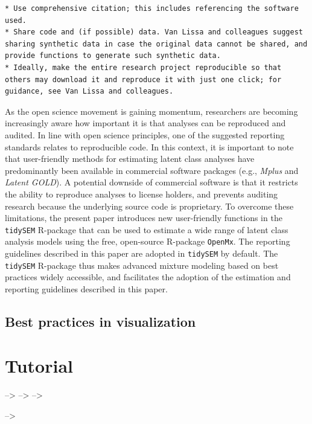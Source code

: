 \documentclass[
  ,man]{apa6}
\begin{document}
\begin{verbatim}
* Use comprehensive citation; this includes referencing the software used.
* Share code and (if possible) data. Van Lissa and colleagues suggest sharing synthetic data in case the original data cannot be shared, and provide functions to generate such synthetic data.
* Ideally, make the entire research project reproducible so that others may download it and reproduce it with just one click; for guidance, see Van Lissa and colleagues.
\end{verbatim}

As the open science movement is gaining momentum,
researchers are becoming increasingly aware
how important it is that analyses can be reproduced and audited.
In line with open science principles, one of the suggested reporting standards relates to reproducible code.
In this context, it is important to note that user-friendly methods for estimating latent class analyses have predominantly been available in commercial software packages (e.g., \emph{Mplus} and \emph{Latent GOLD}).
A potential downside of commercial software is that it restricts the ability to reproduce analyses to license holders,
and prevents auditing research because the underlying source code is proprietary.
To overcome these limitations, the present paper introduces new user-friendly functions in the \texttt{tidySEM} R-package that can be used to estimate a wide range of latent class analysis models using the free, open-source R-package \texttt{OpenMx}.
The reporting guidelines described in this paper are adopted in \texttt{tidySEM} by default.
The \texttt{tidySEM} R-package thus makes advanced mixture modeling based on best practices widely accessible,
and facilitates the adoption of the estimation and reporting guidelines described in this paper.

\hypertarget{best-practices-in-visualization}{%
\subsection{Best practices in visualization}\label{best-practices-in-visualization}}

\hypertarget{tutorial}{%
\section{Tutorial}\label{tutorial}}

--\textgreater{}
--\textgreater{}
--\textgreater{}

--\textgreater{}
\end{document}
